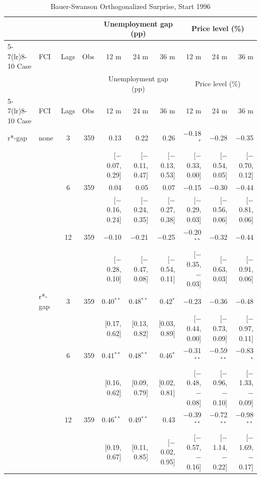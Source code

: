 \begingroup\scriptsize\setlength{\tabcolsep}{0.9pt}
\begin{longtable}{llcrrrrrrr}
\caption{Bauer-Swanson Orthogonalized Surprise, Start 1996}\label{tab:appR5a}\\
\toprule
 & & & & \multicolumn{3}{c}{Unemployment gap (pp)} & \multicolumn{3}{c}{Price level (\%)}\\ \cmidrule(lr){5-7}\cmidrule(lr){8-10}
Case & FCI & Lags & Obs & 12 m & 24 m & 36 m & 12 m & 24 m & 36 m\\
\midrule\endfirsthead
\toprule
 & & & & \multicolumn{3}{c}{Unemployment gap (pp)} & \multicolumn{3}{c}{Price level (\%)}\\ \cmidrule(lr){5-7}\cmidrule(lr){8-10}
Case & FCI & Lags & Obs & 12 m & 24 m & 36 m & 12 m & 24 m & 36 m\\
\midrule\endhead
\bottomrule\endfoot
r*-gap & none & 3 & 359 & 0.13 & 0.22 & 0.26 & $-$0.18$^{*}$ & $-$0.28 & $-$0.35\\
 & & & & {\scriptsize [$-$0.07, 0.29]} & {\scriptsize [$-$0.11, 0.47]} & {\scriptsize [$-$0.13, 0.53]} & {\scriptsize [$-$0.33, 0.00]} & {\scriptsize [$-$0.54, 0.05]} & {\scriptsize [$-$0.70, 0.12]}\\
 &  & 6 & 359 & 0.04 & 0.05 & 0.07 & $-$0.15 & $-$0.30 & $-$0.44\\
 & & & & {\scriptsize [$-$0.16, 0.24]} & {\scriptsize [$-$0.24, 0.35]} & {\scriptsize [$-$0.27, 0.38]} & {\scriptsize [$-$0.29, 0.03]} & {\scriptsize [$-$0.56, 0.06]} & {\scriptsize [$-$0.81, 0.06]}\\
 &  & 12 & 359 & $-$0.10 & $-$0.21 & $-$0.25 & $-$0.20$^{**}$ & $-$0.32 & $-$0.44\\
 & & & & {\scriptsize [$-$0.28, 0.10]} & {\scriptsize [$-$0.47, 0.08]} & {\scriptsize [$-$0.54, 0.11]} & {\scriptsize [$-$0.35, $-$0.03]} & {\scriptsize [$-$0.63, 0.03]} & {\scriptsize [$-$0.91, 0.06]}\\
 & r*-gap & 3 & 359 & 0.40$^{**}$ & 0.48$^{**}$ & 0.42$^{*}$ & $-$0.23 & $-$0.36 & $-$0.48\\
 & & & & {\scriptsize [0.17, 0.62]} & {\scriptsize [0.13, 0.82]} & {\scriptsize [0.03, 0.89]} & {\scriptsize [$-$0.44, 0.00]} & {\scriptsize [$-$0.73, 0.09]} & {\scriptsize [$-$0.97, 0.11]}\\
 &  & 6 & 359 & 0.41$^{**}$ & 0.48$^{**}$ & 0.46$^{*}$ & $-$0.31$^{**}$ & $-$0.59$^{**}$ & $-$0.83$^{*}$\\
 & & & & {\scriptsize [0.16, 0.62]} & {\scriptsize [0.09, 0.79]} & {\scriptsize [0.02, 0.81]} & {\scriptsize [$-$0.48, $-$0.08]} & {\scriptsize [$-$0.96, $-$0.10]} & {\scriptsize [$-$1.33, $-$0.09]}\\
 &  & 12 & 359 & 0.46$^{**}$ & 0.49$^{**}$ & 0.43 & $-$0.39$^{**}$ & $-$0.72$^{**}$ & $-$0.98$^{**}$\\
 & & & & {\scriptsize [0.19, 0.67]} & {\scriptsize [0.11, 0.85]} & {\scriptsize [$-$0.02, 0.95]} & {\scriptsize [$-$0.57, $-$0.16]} & {\scriptsize [$-$1.14, $-$0.22]} & {\scriptsize [$-$1.69, $-$0.17]}\\
\end{longtable}
